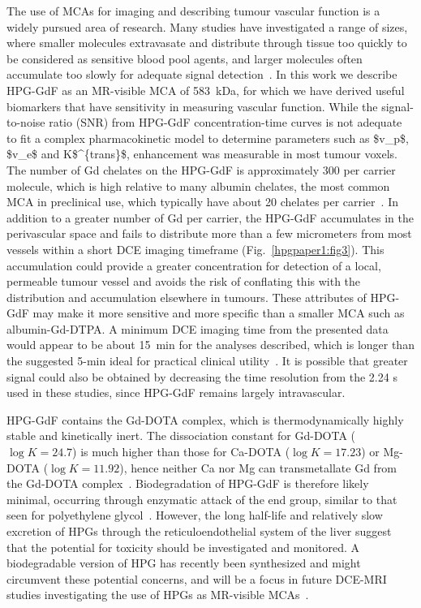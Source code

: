 The use of \acs{MCA}s for imaging and describing tumour vascular function is a widely pursued area of research.
Many studies have investigated a range of sizes, where smaller molecules extravasate and distribute through tissue too quickly to be considered as sensitive blood pool agents, and larger molecules often accumulate too slowly for adequate signal detection~\cite{Kyle:2007ch,Tang:2013fi,Sourbron:2011ce}.
In this work we describe \acs{HPG-GdF} as an MR-visible \acs{MCA} of 583~\acs{kDa}, for which we have derived useful biomarkers that have sensitivity in measuring vascular function.
While the signal-to-noise ratio (\acs{SNR}) from \acs{HPG-GdF} concentration-time curves is not adequate to fit a complex pharmacokinetic model to determine parameters such as \acs{$v_p$}, \acs{$v_e$} and \acs{K$^{trans}$}, enhancement was measurable in most tumour voxels.
The number of Gd chelates on the \acs{HPG-GdF} is approximately 300 per carrier molecule, which is high relative to many albumin chelates, the most common \acs{MCA} in preclinical use, which typically have about 20 chelates per carrier~\cite{Ogan:1987tg}.
In addition to a greater number of Gd per carrier, the \acs{HPG-GdF} accumulates in the perivascular space and fails to distribute more than a few micrometers from most vessels within a short DCE imaging timeframe (Fig.~\ref{hpgpaper1:fig3}).
This accumulation could provide a greater concentration for detection of a local, permeable tumour vessel and avoids the risk of conflating this with the distribution and accumulation elsewhere in tumours.
These attributes of \acs{HPG-GdF} may make it more sensitive and more specific than a smaller  \acs{MCA} such as albumin-Gd-DTPA.
A minimum DCE imaging time from the presented data would appear to be about 15~min for the analyses described, which is longer than the suggested 5-min ideal for practical clinical utility~\cite{Turetschek:2004bw}.
It is possible that greater signal could also be obtained by decreasing the time resolution from the 2.24 s used in these studies, since \acs{HPG-GdF} remains largely intravascular.

\acs{HPG-GdF} contains the Gd-\acs{DOTA} complex, which is thermodynamically highly  stable and kinetically inert.
The dissociation constant for Gd-\acs{DOTA} ($\log K = 24.7$) is much higher than those for Ca-\acs{DOTA} ($\log K = 17.23$) or Mg-\acs{DOTA} ($\log K = 11.92$), hence neither Ca nor Mg can transmetallate Gd from the Gd-\acs{DOTA} complex~\cite{Baranyai:2005ta}.
Biodegradation of \acs{HPG-GdF} is therefore likely minimal, occurring through enzymatic attack of the end group, similar to that seen for polyethylene glycol~\cite{Kawai:2002fc}.
However, the long half-life and relatively slow excretion of HPGs through the reticuloendothelial system of the liver suggest that the potential for toxicity should be investigated and monitored.
A biodegradable version of HPG has recently been synthesized and might circumvent these potential concerns, and will be a focus in future \acs{DCE-MRI} studies investigating the use of HPGs as MR-visible \acs{MCA}s~\cite{Shenoi:2013id}.

